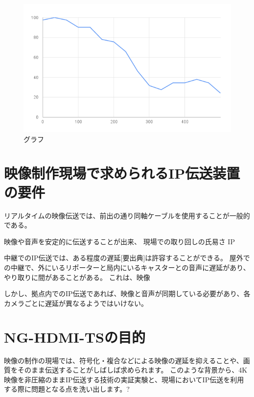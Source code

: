 \begin{figure}[htbp]
  \begin{center}
    \includegraphics[bb=0 0 600 371,width=14cm]{img/mv-delay-result-graph.png}
  \end{center}
  \caption{グラフ}
  \label{fig:mv-delay-result-graph}
\end{figure}

\section{映像制作現場で求められるIP伝送装置の要件}

リアルタイムの映像伝送では、前出の通り同軸ケーブルを使用することが一般的である。

映像や音声を安定的に伝送することが出来、
現場での取り回しの氏易さ
IP

中継でのIP伝送では、ある程度の遅延[要出典]は許容することができる。
屋外での中継で、外にいるリポーターと局内にいるキャスターとの音声に遅延があり、やり取りに間があることがある。
これは、映像

しかし、拠点内でのIP伝送であれば、映像と音声が同期している必要があり、各カメラごとに遅延が異なるようではいけない。


\section{NG-HDMI-TSの目的}

映像の制作の現場では、符号化・複合などによる映像の遅延を抑えることや、画質をそのまま伝送することがしばしば求められます。
このような背景から、4K映像を非圧縮のままIP伝送する技術の実証実験と、現場においてIP伝送を利用する際に問題となる点を洗い出します。?


